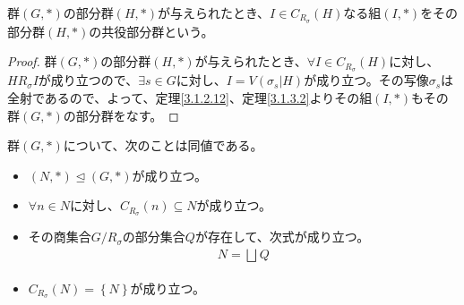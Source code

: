\documentclass[dvipdfmx]{jsarticle}
\begin{document}
\begin{dfn}
群$(G,*)$の部分群$(H,*)$が与えられたとき、$I \in C_{R_{\sigma}}(H)$なる組$(I,*)$をその部分群$(H,*)$の共役部分群という。
\end{dfn}
\begin{proof}
群$(G,*)$の部分群$(H,*)$が与えられたとき、$\forall I \in C_{R_{\sigma}}(H)$に対し、$HR_{\sigma}I$が成り立つので、$\exists s \in G$に対し、$I = V\left( \sigma_{s}|H \right)$が成り立つ。その写像$\sigma_{s}$は全射であるので、よって、定理\ref{3.1.2.12}、定理\ref{3.1.3.2}よりその組$(I,*)$もその群$(G,*)$の部分群をなす。
\end{proof}
\begin{thm}\label{3.1.3.12}
群$(G,*)$について、次のことは同値である。
\begin{itemize}
\item
  $(N,*) \trianglelefteq (G,*)$が成り立つ。
\item
  $\forall n \in N$に対し、$C_{R_{\sigma}}(n) \subseteq N$が成り立つ。
\item
  その商集合${G}/{R_{\sigma}}$の部分集合$Q$が存在して、次式が成り立つ。
\begin{align*}
N = \bigsqcup_{} Q
\end{align*}
\item
  $C_{R_{\sigma}}(N) = \left\{ N \right\}$が成り立つ。
\end{itemize}
\end{thm}
\end{document}
